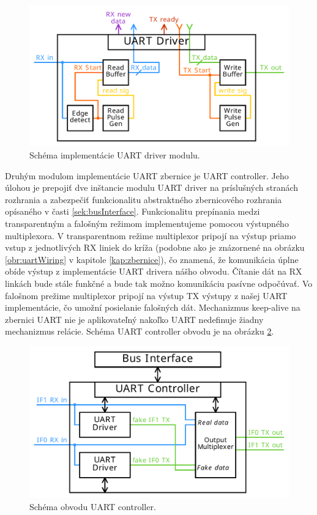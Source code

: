 \begin{figure}
    \centerline{\includegraphics[width=1\textwidth]{images/designs/uartDriver.pdf}}
    \caption[Schéma implementácie UART driver modulu]{Schéma implementácie UART driver modulu.}
    \label{obr:uartDriver}
\end{figure}

Druhým modulom implementácie UART zbernice je UART controller. Jeho úlohou je prepojiť dve inštancie modulu UART driver na príslušných stranách rozhrania a zabezpečiť funkcionalitu abstraktného zbernicového rozhrania opísaného v časti \ref{sek:busInterface}. Funkcionalitu prepínania medzi transparentným a falošným režimom implementujeme pomocou výstupného multiplexora. V transparentnom režime multiplexor pripojí na výstup priamo vstup z jednotlivých RX liniek do kríža (podobne ako je znázornené na obrázku \ref{obr:uartWiring} v kapitole \ref{kap:zbernice}), čo znamená, že komunikácia úplne obíde výstup z implementácie UART drivera nášho obvodu. Čítanie dát na RX linkách bude stále funkčné a bude tak možno komunikáciu pasívne odpočúvať. Vo falošnom prežime multiplexor pripojí na výstup TX výstupy z našej UART implementácie, čo umožní posielanie falošných dát. Mechanizmus keep-alive na zbernici UART nie je aplikovateľný nakoľko UART nedefinuje žiadny mechanizmus relácie. Schéma UART controller obvodu je na obrázku \ref{obr:uartController}.

\begin{figure}
    \centerline{\includegraphics[width=1\textwidth]{images/designs/uartController.pdf}}
    \caption[Schéma obvodu UART controller]{Schéma obvodu UART controller.}
    \label{obr:uartController}
\end{figure}

